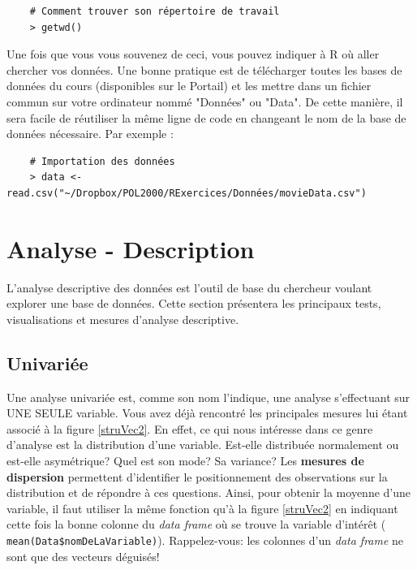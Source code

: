 \documentclass[10.5pt,a4paper]{article}
\newcommand{\rcode}[1]{\texttt{\color{rstudio} #1}}
\begin{document}
    \begin{lstlisting}
    # Comment trouver son répertoire de travail 
    > getwd()
    \end{lstlisting}    

    Une fois que vous vous souvenez de ceci, vous pouvez indiquer à R où aller chercher vos données. Une bonne pratique est de télécharger toutes les bases de données du cours (disponibles sur le Portail) et les mettre dans un fichier commun sur votre ordinateur nommé "Données" ou "Data". De cette manière, il sera facile de réutiliser la même ligne de code en changeant le nom de la base de données nécessaire. Par exemple :
    
      \begin{lstlisting}
    # Importation des données
    > data <- read.csv("~/Dropbox/POL2000/RExercices/Données/movieData.csv")
    \end{lstlisting}

  
\section{Analyse - Description}
L'analyse descriptive des données est l'outil de base du chercheur voulant explorer une base de données. Cette section présentera les principaux tests, visualisations et mesures d'analyse descriptive.
  \subsection{Univariée}
  Une analyse univariée est, comme son nom l'indique, une analyse s'effectuant sur UNE SEULE variable. Vous avez déjà rencontré les principales mesures lui étant associé à la figure \ref{struVec2}. En effet, ce qui nous intéresse dans ce genre d'analyse est la distribution d'une variable. Est-elle distribuée normalement ou est-elle asymétrique? Quel est son mode? Sa variance? Les \textbf{mesures de dispersion} permettent d'identifier le positionnement des observations sur la distribution et de répondre à ces questions. Ainsi, pour obtenir la moyenne d'une variable, il faut utiliser la même fonction qu'à la figure \ref{struVec2} en indiquant cette fois la bonne colonne du \emph{data frame} où se trouve la variable d'intérêt (\rcode{mean(Data\$nomDeLaVariable)}). Rappelez-vous: les colonnes d'un \emph{data frame} ne sont que des vecteurs déguisés!
  
\end{document}
